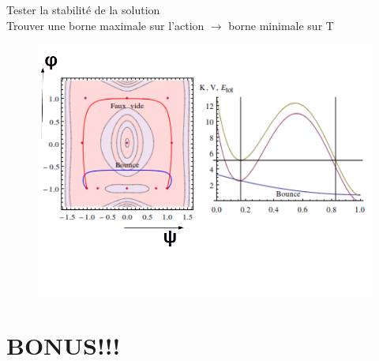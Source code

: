 \documentclass[handout]{beamer}
\newcommand{\Tau}{\mathrm{T}}
\begin{document}
\begin{frame}
Tester la stabilité de la solution\\[0.5 cm]
 Trouver une borne maximale sur l'action $\rightarrow$ borne minimale sur $\Tau$

  \begin{figure}
     \includegraphics[scale=0.35]{ener2.png}
    \end{figure}
%    

    

 
\end{frame}

\section{BONUS!!!}
\end{document}
